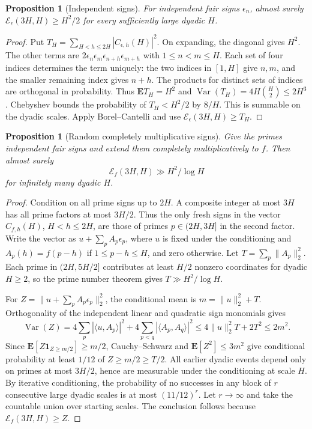 \documentclass[11pt]{amsart}
\newtheorem{proposition}[theorem]{Proposition}
\theoremstyle{definition}
\theoremstyle{remark}
\newcommand{\E}{\mathcal E}
\newcommand{\one}{\mathbf 1}
\numberwithin{equation}{section}
\begin{document}
\begin{proposition}[Independent signs]\label{prop:random}
For independent fair signs \(\epsilon_n\), almost surely \(\E_\epsilon(3H,H)\ge H^2/2\) for every sufficiently large dyadic \(H\).
\end{proposition}
\begin{proof}
Put \(T_H=\sum_{H<h\le2H}|C_{\epsilon,h}(H)|^2\). On expanding, the diagonal gives \(H^2\). The other terms are \(2\epsilon_n\epsilon_m\epsilon_{n+h}\epsilon_{m+h}\) with \(1\le n<m\le H\). Each set of four indices determines the term uniquely: the two indices in \([1,H]\) give \(n,m\), and the smaller remaining index gives \(n+h\). The products for distinct sets of indices are orthogonal in probability. Thus \(\mathbf E T_H=H^2\) and \(\operatorname{Var}(T_H)=4H\binom H2\le2H^3\). Chebyshev bounds the probability of \(T_H<H^2/2\) by \(8/H\). This is summable on the dyadic scales. Apply Borel--Cantelli and use \(\E_\epsilon(3H,H)\ge T_H\).
\end{proof}

\begin{proposition}[Random completely multiplicative signs]\label{prop:rmult}
Give the primes independent fair signs and extend them completely multiplicatively to \(f\). Then almost surely
\[
 \E_f(3H,H)\gg H^2/\log H
\]
for infinitely many dyadic \(H\).
\end{proposition}
\begin{proof}
Condition on all prime signs up to \(2H\). A composite integer at most \(3H\) has all prime factors at most \(3H/2\). Thus the only fresh signs in the vector \(C_{f,h}(H)\), \(H<h\le2H\), are those of primes \(p\in(2H,3H]\) in the second factor. Write the vector as \(u+\sum_p A_p\epsilon_p\), where \(u\) is fixed under the conditioning and \(A_p(h)=f(p-h)\) if \(1\le p-h\le H\), and zero otherwise. Let \(T=\sum_p\|A_p\|_2^2\). Each prime in \((2H,5H/2]\) contributes at least \(H/2\) nonzero coordinates for dyadic \(H\ge2\), so the prime number theorem gives \(T\gg H^2/\log H\).

For \(Z=\|u+\sum_p A_p\epsilon_p\|_2^2\), the conditional mean is \(m=\|u\|_2^2+T\). Orthogonality of the independent linear and quadratic sign monomials gives
\[
 \operatorname{Var}(Z)=4\sum_p|\langle u,A_p\rangle|^2+
 4\sum_{p<q}|\langle A_p,A_q\rangle|^2
 \le4\|u\|_2^2T+2T^2\le2m^2 .
\]
Since \(\mathbf E[Z\one_{Z\ge m/2}]\ge m/2\), Cauchy--Schwarz and \(\mathbf E[Z^2]\le3m^2\) give conditional probability at least \(1/12\) of \(Z\ge m/2\ge T/2\). All earlier dyadic events depend only on primes at most \(3H/2\), hence are measurable under the conditioning at scale \(H\). By iterative conditioning, the probability of no successes in any block of \(r\) consecutive large dyadic scales is at most \((11/12)^r\). Let \(r\to\infty\) and take the countable union over starting scales. The conclusion follows because \(\E_f(3H,H)\ge Z\).
\end{proof}
\end{document}
